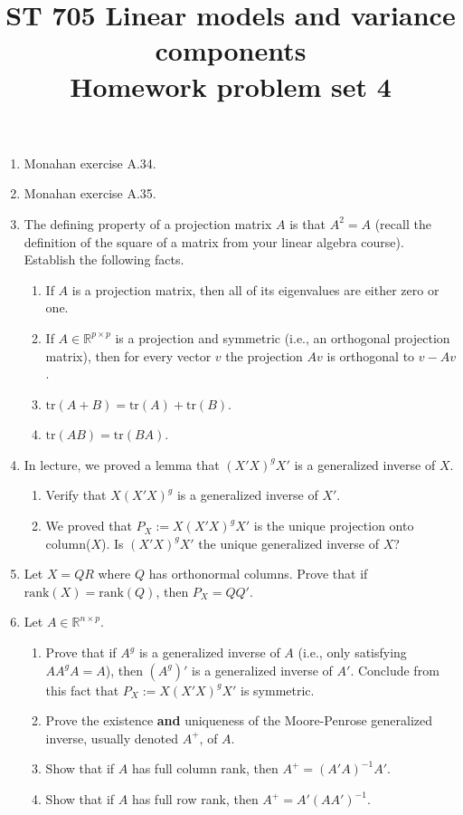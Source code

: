 \documentclass[11pt]{article}
\title{ST 705 Linear models and variance components \\ 
        Homework problem set 4}
\begin{document}
\maketitle

\begin{enumerate}

\item Monahan exercise A.34.

\item Monahan exercise A.35.

\item The defining property of a projection matrix $A$ is that $A^{2} = A$ (recall the definition of the square of a matrix from your linear algebra course).  Establish the following facts.
\begin{enumerate}
\item If $A$ is a projection matrix, then all of its eigenvalues are either zero or one. 
\item If $A \in \mathbb{R}^{p\times p}$ is a projection and symmetric (i.e., an orthogonal projection matrix), then for every vector $v$ the projection $Av$ is orthogonal to $v - Av$.
\item $\text{tr}(A + B) = \text{tr}(A) + \text{tr}(B)$.
\item $\text{tr}(AB) = \text{tr}(BA)$.
\end{enumerate}

\item In lecture, we proved a lemma that $(X'X)^{g}X'$ is a generalized inverse of $X$.
\begin{enumerate}
\item Verify that $X(X'X)^{g}$ is a generalized inverse of $X'$.
\item We proved that $P_{X} := X(X'X)^{g}X'$ is the unique projection onto column($X$).  Is $(X'X)^{g}X'$ the unique generalized inverse of $X$?  
\end{enumerate}

\item Let $X = QR$ where $Q$ has orthonormal columns.  Prove that if $\text{rank}(X) = \text{rank}(Q)$, then $P_{X} = QQ'$.

\item Let $A \in \mathbb{R}^{n\times p}$.
\begin{enumerate}
\item Prove that if $A^{g}$ is a generalized inverse of $A$ (i.e., only satisfying $AA^{g}A = A$), then $(A^{g})'$ is a generalized inverse of $A'$.  Conclude from this fact that $P_{X} := X(X'X)^{g}X'$ is symmetric.
\item Prove the existence \textbf{and} uniqueness of the Moore-Penrose generalized inverse, usually denoted $A^{+}$, of $A$.
\item Show that if $A$ has full column rank, then $A^{+} = (A'A)^{-1}A'$.  
\item Show that if $A$ has full row rank, then $A^{+} = A'(AA')^{-1}$.
\end{enumerate}



\end{enumerate}
\end{document}
